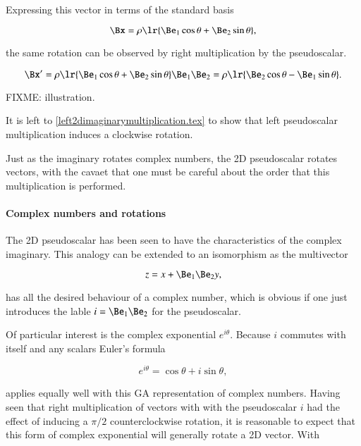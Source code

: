 Expressing this vector in terms of the standard basis

\begin{dmath}\label{eqn:SimpleProducts2:280}
   \Bx = \rho \lr{ \Be_1 \cos\theta + \Be_2 \sin\theta },
\end{dmath}

the same rotation can be observed by right multiplication by the pseudoscalar.

\begin{dmath}\label{eqn:SimpleProducts2:300}
\Bx'
= \rho \lr{ \Be_1 \cos\theta + \Be_2 \sin\theta } \Be_1 \Be_2
= \rho \lr{ \Be_2 \cos\theta - \Be_1 \sin\theta }.
\end{dmath}

FIXME: illustration.

It is left to \cref{left2dimaginarymultiplication.tex} to show that left pseudoscalar multiplication induces a clockwise rotation.

Just as the imaginary rotates complex numbers, the 2D pseudoscalar rotates vectors, with the cavaet that one must be careful about the order that this multiplication is performed.

\paragraph{Complex numbers and rotations}

The 2D pseudoscalar has been seen to have the characteristics of the complex imaginary.  This analogy can be extended to an isomorphism as the multivector

\begin{dmath}\label{eqn:SimpleProducts2:320}
z = x + \Be_1 \Be_2 y,
\end{dmath}

has all the desired behaviour of a complex number, which is obvious if one just introduces the lable \( i = \Be_1 \Be_2 \) for the pseudoscalar.

Of particular interest is the complex exponential \( e^{i \theta} \).  Because \( i \) commutes with itself and any scalars Euler's formula

\begin{dmath}\label{eqn:SimpleProducts2:340}
e^{i \theta} = \cos\theta + i \sin\theta,
\end{dmath}

applies equally well with this GA representation of complex numbers.  Having seen that right multiplication of vectors with with the pseudoscalar \( i \) had the effect of inducing a \( \pi/2 \) counterclockwise rotation, it is reasonable to expect that this form of complex exponential will generally rotate a 2D vector.  With

